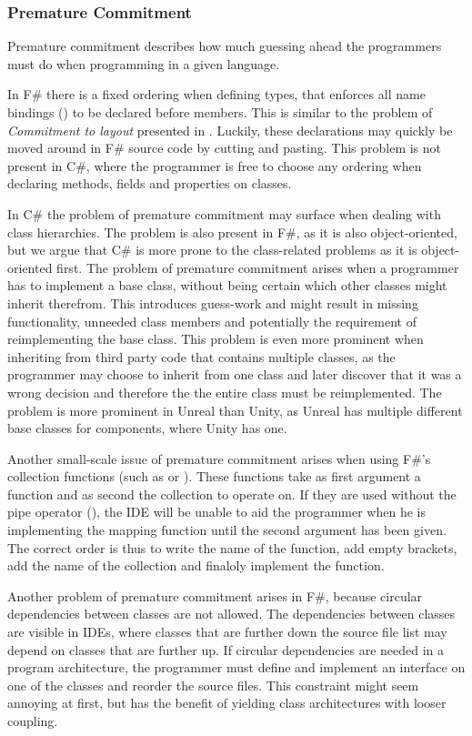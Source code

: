 \subsubsection{Premature Commitment}
Premature commitment describes how much guessing ahead the programmers must do when programming in a given language.

In F\# there is a fixed ordering when defining types, that enforces all name bindings () to be declared before members. This is similar to the problem of \textit{Commitment to layout} presented in \cite{green1996usability}. Luckily, these declarations may quickly be moved around in F\# source code by cutting and pasting. This problem is not present in C\#, where the programmer is free to choose any ordering when declaring methods, fields and properties on classes.

In C\# the problem of premature commitment may surface when dealing with class hierarchies. The problem is also present in F\#, as it is also object-oriented, but we argue that C\# is more prone to the class-related problems as it is object-oriented first. The problem of premature commitment arises when a programmer has to implement a base class, without being certain which other classes might inherit therefrom. This introduces guess-work and might result in missing functionality, unneeded class members and potentially the requirement of reimplementing the base class. This problem is even more prominent when inheriting from third party code that contains multiple classes\cite{mikhajlov1998study}, as the programmer may choose to inherit from one class and later discover that it was a wrong decision and therefore the the entire class must be reimplemented. The problem is more prominent in Unreal than Unity, as Unreal has multiple different base classes for components\cite{unreal:components}, where Unity has one.

Another small-scale issue of premature commitment arises when using F\#'s collection functions (such as  or ). These functions take as first argument a function and as second the collection to operate on. If they are used without the pipe operator (\ttt{|\textgreater}), the \gls{IDE} will be unable to aid the programmer when he is implementing the mapping function until the second argument has been given. The correct order is thus to write the name of the function, add empty brackets, add the name of the collection and finaloly implement the function.

Another problem of premature commitment arises in F\#, because circular dependencies between classes are not allowed. The dependencies between classes are visible in \glspl{IDE}, where classes that are further down the source file list may depend on classes that are further up. If circular dependencies are needed in a program architecture, the programmer must define and implement an interface on one of the classes and reorder the source files. This constraint might seem annoying at first, but has the benefit of yielding class architectures with looser coupling\cite{interfaces:and:coupling}.
